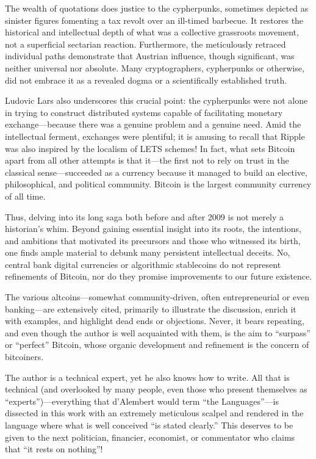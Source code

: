 \documentclass[
  a5paper,
  smalldemyvopaper,10pt,twoside,onecolumn,openright,extrafontsizes,hidelinks]{memoir}
\begin{document}
The wealth of quotations does justice to the cypherpunks, sometimes
depicted as sinister figures fomenting a tax revolt over an ill-timed
barbecue. It restores the historical and intellectual depth of what was
a collective grassroots movement, not a superficial sectarian reaction.
Furthermore, the meticulously retraced individual paths demonstrate that
Austrian influence, though significant, was neither universal nor
absolute. Many cryptographers, cypherpunks or otherwise, did not embrace
it as a revealed dogma or a scientifically established truth.

Ludovic Lars also underscores this crucial point: the cypherpunks were
not alone in trying to construct distributed systems capable of
facilitating monetary exchange---because there was a genuine problem and
a genuine need. Amid the intellectual ferment, exchanges were plentiful;
it is amusing to recall that Ripple was also inspired by the localism of
LETS schemes! In fact, what sets Bitcoin apart from all other attempts
is that it---the first not to rely on trust in the classical
sense---succeeded as a currency because it managed to build an elective,
philosophical, and political community. Bitcoin is the largest community
currency of all time.

Thus, delving into its long saga both before and after 2009 is not
merely a historian's whim. Beyond gaining essential insight into its
roots, the intentions, and ambitions that motivated its precursors and
those who witnessed its birth, one finds ample material to debunk many
persistent intellectual deceits. No, central bank digital currencies or
algorithmic stablecoins do not represent refinements of Bitcoin, nor do
they promise improvements to our future existence.

The various altcoins---somewhat community-driven, often entrepreneurial
or even banking---are extensively cited, primarily to illustrate the
discussion, enrich it with examples, and highlight dead ends or
objections. Never, it bears repeating, and even though the author is
well acquainted with them, is the aim to ``surpass'' or ``perfect''
Bitcoin, whose organic development and refinement is the concern of
bitcoiners.

The author is a technical expert, yet he also knows how to write. All
that is technical (and overlooked by many people, even those who present
themselves as ``experts'')---everything that d'Alembert would term ``the
Languages''---is dissected in this work with an extremely meticulous
scalpel and rendered in the language where what is well conceived ``is
stated clearly.'' This deserves to be given to the next politician,
financier, economist, or commentator who claims that ``it rests on
nothing''!
\end{document}
